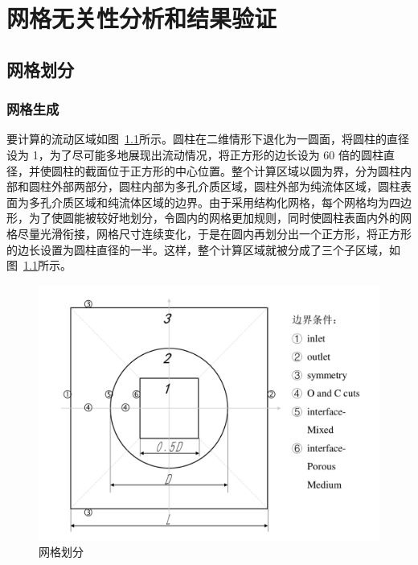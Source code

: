 \chapter{网格无关性分析和结果验证}\label{chap: validation}

\section{网格划分}\label{sec: grid}

\subsection{网格生成}

要计算的流动区域如图~\ref{fig: grid}所示。圆柱在二维情形下退化为一圆面，将圆柱的直径设为 1，为了尽可能多地展现出流动情况，将正方形的边长设为 60 倍的圆柱直径，并使圆柱的截面位于正方形的中心位置。整个计算区域以圆为界，分为圆柱内部和圆柱外部两部分，圆柱内部为多孔介质区域，圆柱外部为纯流体区域，圆柱表面为多孔介质区域和纯流体区域的边界。由于采用结构化网格，每个网格均为四边形，为了使圆能被较好地划分，令圆内的网格更加规则，同时使圆柱表面内外的网格尽量光滑衔接，网格尺寸连续变化，于是在圆内再划分出一个正方形，将正方形的边长设置为圆柱直径的一半。这样，整个计算区域就被分成了三个子区域，如图~\ref{fig: grid}所示。

\begin{figure}
	\centering
	\includegraphics[scale=.7]{figs/grid}
	\caption{网格划分}\label{fig: grid}
\end{figure}

